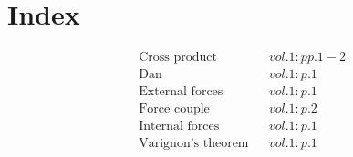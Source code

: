 \documentclass[a4paper]{article}
\begin{document}
 
\section*{Index} 
\begin{align*} 
&\text{Cross product}&& vol. 1: pp. 1-2\\
&\text{Dan}&& vol. 1: p. 1\\
&\text{External forces}&& vol. 1: p. 1\\
&\text{Force couple}&& vol. 1: p. 2\\
&\text{Internal forces}&& vol. 1: p. 1\\
&\text{Varignon's theorem}&& vol. 1: p. 1\\
\end{align*} 
\end{document}
